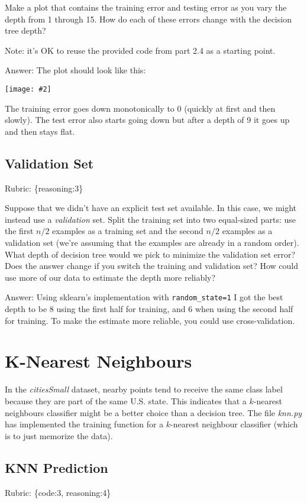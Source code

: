 \documentclass{article}
\def\ans#1{\par\gre{Answer: #1}}
\def\answer#1{\ans{#1}}
\def\rubric#1{\gre{Rubric: \{#1\}}}{}
\def\blu#1{{\color{blu}#1}}
\def\gre#1{{\color{gre}#1}}
\newcommand{\centerfig}[2]{\begin{center}\texttt{[image: \#2]}\end{center}}
\begin{document}
\blu{Make a plot that contains the training error and testing error as you vary the depth from 1 through 15. How do each of these errors change with the decision tree depth?}

Note: it's OK to reuse the provided code from part 2.4 as a starting point.

\answer{
The plot should look like this:
\centerfig{.45}{../figs/q3_1_trainTest}
The training error goes down monotonically to 0 (quickly at first and then slowly). The test error also starts going down but after a depth of 9 it goes up and then stays flat.
}

\subsection{Validation Set}
\rubric{reasoning:3}

Suppose that we didn't have an explicit test set available. In this case, we might instead use a \emph{validation} set. Split the training set into two equal-sized parts: use the first $n/2$ examples as a training set and the second $n/2$ examples as a validation set (we're assuming that the examples are already in a random order). \blu{What depth of decision tree would we pick to minimize the validation set error? Does the answer change if you switch the training and validation set? How could use more of our data to  estimate the depth more reliably?}

\answer{
Using sklearn's implementation with \texttt{random\string_state=1} I got the best depth to be 8 using the first half for training,
and 6 when using the second half for training. To make the estimate more reliable, you could use cross-validation.
}

\section{K-Nearest Neighbours}

In the \emph{citiesSmall} dataset, nearby points tend to receive the same class label because they are part of the same U.S. state. This indicates that a $k$-nearest neighbours classifier might be a better choice than a decision tree. The file \emph{knn.py} has implemented the training function for a $k$-nearest neighbour classifier (which is to just memorize the data).


\subsection{KNN Prediction}
\rubric{code:3, reasoning:4}
\end{document}
